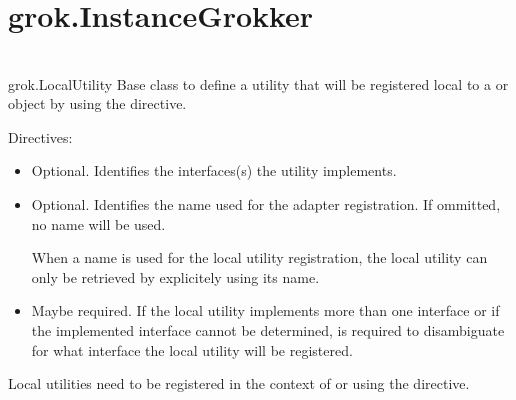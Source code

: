 \section{grok.InstanceGrokker}

\section{}

\section{}

  \begin{classdesc*}{grok.LocalUtility}
    Base class to define a utility that will be registered local to a
     or  object by using the
     directive.

  \begin{bf}Directives:\end{bf}

  \begin{itemize}
    \item[\function{grok.implements(*interfaces)}] Optional. Identifies the
    interfaces(s) the utility implements.

    \item[\function{grok.name(name)}] Optional. Identifies the name used for
    the adapter registration. If ommitted, no name will be used.

    When a name is used for the local utility registration, the local utility
    can only be retrieved by explicitely using its name.

    \item[\function{grok.provides(name)}] Maybe required. If the local utility
    implements more than one interface or if the implemented interface cannot
    be determined,  is required to disambiguate for
    what interface the local utility will be registered.
  \end{itemize}
  \end{classdesc*}

  \begin{seealso}
  Local utilities need to be registered in the context of  or
   using the  directive.
  \end{seealso}

